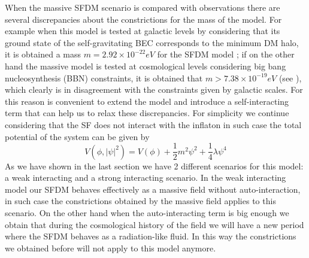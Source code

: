 \documentclass[amssymb,twocolumn,prd,nofootinbib,showpacs]{revtex4-1}
\begin{document}
When the massive SFDM scenario is compared with observations there are several discrepancies about the constrictions for the mass of the model. For example when this model is tested at galactic levels by considering that its ground state of the self-gravitating BEC corresponds to the minimum DM halo, it is obtained a mass $m=2.92\times 10^{-22}eV$ for the SFDM model \cite{massconst1,SFphi42}; if on the other hand the massive model is tested at cosmological levels considering big bang nucleosynthesis (BBN) constraints, it is obtained that $m>7.38\times 10^{-19}eV$ (see \cite{SFphi41,SFphi42}), which clearly is in disagreement with the constraints given by galactic scales. For this reason is convenient to extend the model and introduce a self-interacting term that can help us to relax these discrepancies. For simplicity we continue considering that the SF does not interact with the inflaton in such case the total potential of the system can be given by
\begin{equation}
V(\phi,|\psi|^2)=V(\phi)+\frac{1}{2}m^2\psi^2+\frac{1}{4}\lambda\psi^4
\end{equation}
As we have shown in the last section we have 2 different scenarios for this model: a weak interacting and a strong interacting scenario. In the weak interacting model our SFDM behaves effectively as a massive field without auto-interaction, in such case the constrictions obtained by the massive field applies to this scenario. On the other hand when the auto-interacting term is big enough we obtain that during the cosmological history of the field we will have a new period where the SFDM behaves as a radiation-like fluid. In this way the constrictions we obtained before will not apply to this model anymore.
\end{document}
